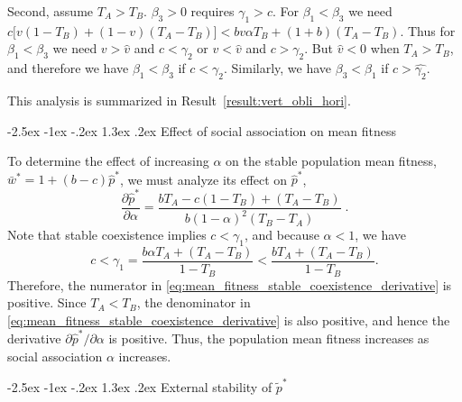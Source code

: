 \documentclass[12pt]{extarticle}
\makeatletter
\renewcommand\section{\@startsection {section}{1}{\z@}%
     {-2.5ex \@plus -1ex \@minus -.2ex}%
     {1.3ex \@plus.2ex}%
    {\Large\bfseries}}
\makeatother
\begin{document}
\begin{appendices}
Second, assume $T_A>T_B$.
$\beta_3>0$ requires $\gamma_1 > c$. 
For $\beta_1<\beta_3$ we need $c\big[v(1-T_B) + (1-v)(T_A-T_B)\big] < bv\alpha T_B + (1+b)(T_A-T_B)$.
Thus for $\beta_1<\beta_3$ we need $v > \hat v$ and $c < \gamma_2 $ or $v < \hat v$ and $c > \gamma_2$.
But $\hat{v}<0$ when $T_A > T_B$, and therefore we have $\beta_1<\beta_3$ if $c < \gamma_2$. Similarly, we have $\beta_3<\beta_1$ if $c > \hat{\gamma_2}$.

This analysis is summarized in Result~\ref{result:vert_obli_hori}.

\section{Effect of social association on mean fitness} \label{sec:appendixC}

To determine the effect of increasing $\alpha$ on the stable population mean fitness, $\bar{w}^*=1+(b-c)\hat{p}^*$, we must analyze its effect on $\hat{p}^*$, 
\begin{equation} \label{eq:mean_fitness_stable_coexistence_derivative}
  \frac{\partial \hat{p}^*}{\partial \alpha} 
  = \frac{b T_A - c(1-T_B) + (T_A-T_B)}{b (1-\alpha)^2 (T_B-T_A)} \;.
\end{equation} 
Note that stable coexistence implies $c<\gamma_1$, and because $\alpha<1$, we have
\begin{equation}
c < \gamma_1 = \frac{b \alpha T_A + (T_A-T_B)}{1-T_B} < \frac{b T_A + (T_A-T_B)}{1-T_B}.
\end{equation} 
Therefore, the numerator in \autoref{eq:mean_fitness_stable_coexistence_derivative} is positive.
Since $T_A<T_B$, the denominator in \autoref{eq:mean_fitness_stable_coexistence_derivative} is also positive, and hence the derivative $\partial \hat{p}^* / \partial \alpha$ is positive.
Thus, the population mean fitness increases as social association $\alpha$ increases.



\section{External stability of $\tilde{p}^*$} \label{sec:appendixD}


\end{appendices}
\end{document}
